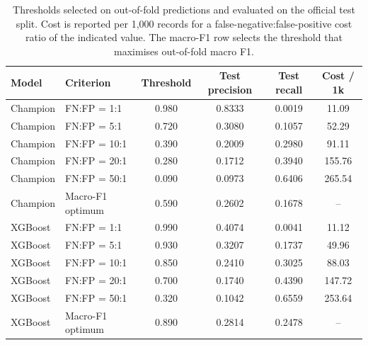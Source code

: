 \begin{table}[H]
\centering
\caption{Thresholds selected on out-of-fold predictions and evaluated on the official
test split. Cost is reported per 1{,}000 records for a false-negative:false-positive
cost ratio of the indicated value. The macro-F1 row selects the threshold that maximises
out-of-fold macro F1.}
\label{tab:bo-threshold}
\small
\begin{tabular}{llcccc}
\toprule
Model & Criterion & Threshold & Test precision & Test recall & Cost / 1k \\
\midrule
Champion & FN:FP = 1:1 & 0.980 & 0.8333 & 0.0019 & 11.09 \\
Champion & FN:FP = 5:1 & 0.720 & 0.3080 & 0.1057 & 52.29 \\
Champion & FN:FP = 10:1 & 0.390 & 0.2009 & 0.2980 & 91.11 \\
Champion & FN:FP = 20:1 & 0.280 & 0.1712 & 0.3940 & 155.76 \\
Champion & FN:FP = 50:1 & 0.090 & 0.0973 & 0.6406 & 265.54 \\
Champion & Macro-F1 optimum & 0.590 & 0.2602 & 0.1678 & -- \\
XGBoost & FN:FP = 1:1 & 0.990 & 0.4074 & 0.0041 & 11.12 \\
XGBoost & FN:FP = 5:1 & 0.930 & 0.3207 & 0.1737 & 49.96 \\
XGBoost & FN:FP = 10:1 & 0.850 & 0.2410 & 0.3025 & 88.03 \\
XGBoost & FN:FP = 20:1 & 0.700 & 0.1740 & 0.4390 & 147.72 \\
XGBoost & FN:FP = 50:1 & 0.320 & 0.1042 & 0.6559 & 253.64 \\
XGBoost & Macro-F1 optimum & 0.890 & 0.2814 & 0.2478 & -- \\
\bottomrule
\end{tabular}
\end{table}
